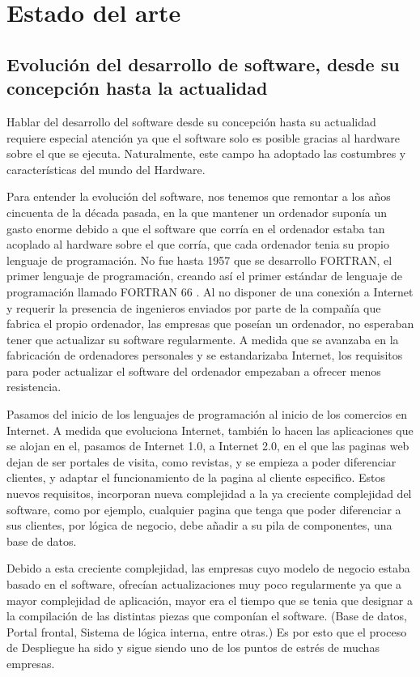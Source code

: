\documentclass[12pt]{report} %
\begin{document}
\chapter{Estado del arte}

\section{Evolución del desarrollo de software, desde su concepción hasta la
actualidad}

Hablar del desarrollo del software desde su concepción hasta su actualidad
requiere especial atención ya que el software solo es posible gracias al
hardware sobre el que se ejecuta.  Naturalmente, este campo ha adoptado las
costumbres y características del mundo del Hardware.

Para entender la evolución del software, nos tenemos que remontar a los años
cincuenta de la década pasada, en la que mantener un ordenador suponía un gasto
enorme debido a que el software que corría en el ordenador estaba tan acoplado
al hardware sobre el que corría, que cada ordenador tenia su propio lenguaje de
programación.  No fue hasta 1957 que se desarrollo FORTRAN, el primer lenguaje
de programación, creando así el primer estándar de lenguaje de programación
llamado FORTRAN 66 \nocite{FORTRAN1966}.  Al no disponer de una conexión a
Internet y requerir la presencia de ingenieros enviados por parte de la compañía
que fabrica el propio ordenador, las empresas que poseían un ordenador, no
esperaban tener que actualizar su software regularmente.  A medida que se
avanzaba en la fabricación de ordenadores personales y se estandarizaba
Internet, los requisitos para poder actualizar el software del ordenador
empezaban a ofrecer menos resistencia.

Pasamos del inicio de los lenguajes de programación al inicio de los comercios
en Internet.  A medida que evoluciona Internet, también lo hacen las
aplicaciones que se alojan en el, pasamos de Internet 1.0, a  Internet 2.0, en
el que las paginas web dejan de ser portales de visita, como revistas, y se
empieza a poder diferenciar clientes, y adaptar el funcionamiento de la pagina
al cliente especifico.  Estos nuevos requisitos, incorporan nueva complejidad a
la ya creciente complejidad del software, como por ejemplo, cualquier pagina que
tenga que poder diferenciar a sus clientes, por lógica de negocio, debe añadir a
su pila de componentes, una base de datos.

Debido a esta creciente complejidad, las empresas cuyo modelo de negocio estaba
basado en el software, ofrecían actualizaciones muy poco regularmente ya que a
mayor complejidad de aplicación, mayor era el tiempo que se tenia que designar a
la compilación de las distintas piezas que componían el software. (Base de
datos, Portal frontal, Sistema de lógica interna, entre otras.) Es por esto que
el proceso de Despliegue ha sido y sigue siendo uno de los puntos de estrés de
muchas empresas.
\end{document}
